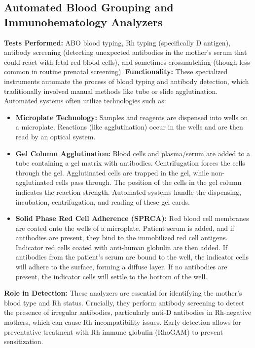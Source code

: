 \documentclass{article}
\begin{document}
\subsection{Automated Blood Grouping and Immunohematology Analyzers}
\textbf{Tests Performed:} ABO blood typing, Rh typing (specifically D antigen), antibody screening (detecting unexpected antibodies in the mother's serum that could react with fetal red blood cells), and sometimes crossmatching (though less common in routine prenatal screening).
\textbf{Functionality:} These specialized instruments automate the process of blood typing and antibody detection, which traditionally involved manual methods like tube or slide agglutination. Automated systems often utilize technologies such as:
\begin{itemize}
    \item \textbf{Microplate Technology:} Samples and reagents are dispensed into wells on a microplate. Reactions (like agglutination) occur in the wells and are then read by an optical system.
    \item \textbf{Gel Column Agglutination:} Blood cells and plasma/serum are added to a tube containing a gel matrix with antibodies. Centrifugation forces the cells through the gel. Agglutinated cells are trapped in the gel, while non-agglutinated cells pass through. The position of the cells in the gel column indicates the reaction strength. Automated systems handle the dispensing, incubation, centrifugation, and reading of these gel cards.
    \item \textbf{Solid Phase Red Cell Adherence (SPRCA):} Red blood cell membranes are coated onto the wells of a microplate. Patient serum is added, and if antibodies are present, they bind to the immobilized red cell antigens. Indicator red cells coated with anti-human globulin are then added. If antibodies from the patient's serum are bound to the well, the indicator cells will adhere to the surface, forming a diffuse layer. If no antibodies are present, the indicator cells will settle to the bottom of the well.
\end{itemize}
\textbf{Role in Detection:} These analyzers are essential for identifying the mother's blood type and Rh status. Crucially, they perform antibody screening to detect the presence of irregular antibodies, particularly anti-D antibodies in Rh-negative mothers, which can cause Rh incompatibility issues. Early detection allows for preventative treatment with Rh immune globulin (RhoGAM) to prevent sensitization.
\end{document}
